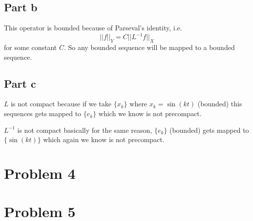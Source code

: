 \documentclass[12pt]{article}%
\begin{document}
\subsection*{Part b}
This operator is bounded because of Parseval's identity, i.e.
\[
	||f||_Y=C||L^{-1}f||_X
\]
for some constant $C$. So any bounded sequence will be mapped to a
bounded sequence.
\subsection*{Part c}
$L$ is not compact because if we take $\{x_k\}$ where $x_k=\sin(kt)$ (bounded)
this sequences gets mapped to $\{e_k\}$ which we know is not precompact.

$L^{-1}$ is not compact basically for the same reason, $\{e_k\}$ (bounded) gets
mapped to $\{\sin(kt)\}$ which again we know is not precompact.
\section*{Problem 4}
\section*{Problem 5}
\end{document}
